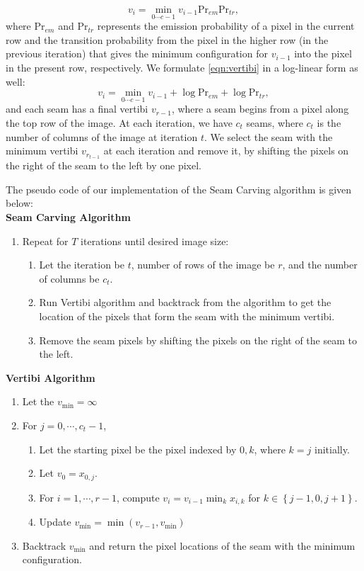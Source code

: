 \documentclass[a4paper]{article}
\begin{document}
	\begin{equation}
		v_i = \min_{0\cdots c-1} v_{i-1}\text{Pr}_{em}\text{Pr}_{tr},
		\label{eqn:vertibi}
	\end{equation}
	where $\text{Pr}_{em}$ and $\text{Pr}_{tr}$ represents the emission probability of a pixel in the current row and the transition probability from the pixel in the higher row (in the previous iteration) that gives the minimum configuration for $v_{i-1}$ into the pixel in the present row, respectively. We formulate \ref{eqn:vertibi} in a log-linear form as well:
	\begin{equation}
		v_i = \min_{0\cdots c-1} v_{i-1} + \log\text{Pr}_{em} + \log\text{Pr}_{tr},
	\end{equation}	
	and each seam has a final vertibi $v_{r-1}$, where a seam begins from a pixel along the top row of the image. At each iteration, we have $c_t$ seams, where $c_t$ is the number of columns of the image at iteration $t$. We select the seam with the minimum vertibi $v_{r_{t-1}}$  at each iteration and remove it, by shifting the pixels on the right of the seam to the left by one pixel. 
	
	The pseudo code of our implementation of the Seam Carving algorithm is given below: \\
	
	\textbf{Seam Carving Algorithm}
	\begin{enumerate}[noitemsep]
		\item Repeat for $T$ iterations until desired image size:
		\begin{enumerate}[noitemsep]
			\item Let the iteration be $t$, number of rows of the image be $r$, and the number of columns be $c_t$.
			\item Run Vertibi algorithm and backtrack from the algorithm to get the location of the pixels that form the seam with the minimum vertibi.
			\item Remove the seam pixels by shifting the pixels on the right of the seam to the left.
		\end{enumerate}
	\end{enumerate} 
	
	\textbf{Vertibi Algorithm}
	\begin{enumerate}[noitemsep]
		\item Let the $v_\text{min} = \infty$
		\item For $j = 0, \cdots, c_t-1$, 
		\begin{enumerate}[noitemsep]
			\item Let the starting pixel be the pixel indexed by $0,k$, where $k=j$ initially.
			\item Let $v_0 = x_{0,j}$.
			\item For $i=1, \cdots, r-1$, compute $v_i = v_{i-1}\min_k x_{i,k}$ for $k \in \left\{j-1, 0, j+1\right\}$. 
			\item Update $v_\text{min} = \min(v_{r-1}, v_\text{min})$ 
		\end{enumerate}
		\item Backtrack $v_\text{min}$ and return the pixel locations of the seam with the minimum configuration.
	\end{enumerate}
	
\end{document}
